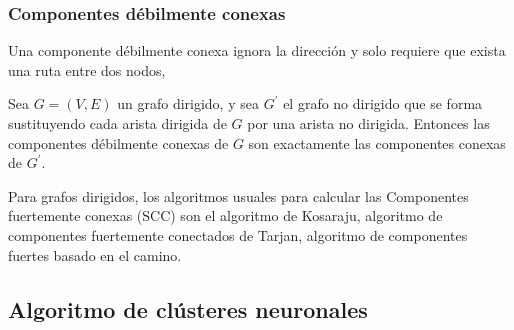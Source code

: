 \subsubsection{Componentes débilmente conexas}
Una componente débilmente conexa ignora la dirección y solo requiere que exista una ruta entre dos nodos,

\begin{definitionT}\label{WCC}
	Sea $G = (V, E)$ un grafo dirigido, y sea $G^\prime$ el grafo no dirigido que se forma sustituyendo cada arista dirigida de $G$ por una arista no dirigida. Entonces las componentes débilmente conexas de $G$ son exactamente las componentes conexas de $G^\prime$.
\end{definitionT}

Para grafos dirigidos, los algoritmos usuales para calcular las Componentes fuertemente conexas (SCC)  son el algoritmo de Kosaraju, algoritmo de componentes fuertemente conectados de Tarjan, algoritmo de componentes fuertes basado en el camino. 

\subsection{Algoritmo de clústeres neuronales }\label{sec:alg_cluster}

